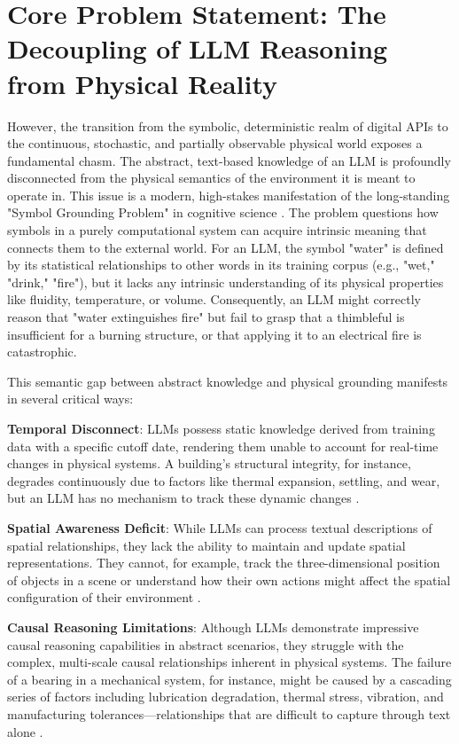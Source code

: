 \section{Core Problem Statement: The Decoupling of LLM Reasoning from Physical Reality}

However, the transition from the symbolic, deterministic realm of digital APIs to the continuous, stochastic, and partially observable physical world exposes a fundamental chasm. The abstract, text-based knowledge of an LLM is profoundly disconnected from the physical semantics of the environment it is meant to operate in. This issue is a modern, high-stakes manifestation of the long-standing "Symbol Grounding Problem" in cognitive science \cite{harnad1990symbol, searle1980minds}. The problem questions how symbols in a purely computational system can acquire intrinsic meaning that connects them to the external world. For an LLM, the symbol "water" is defined by its statistical relationships to other words in its training corpus (e.g., "wet," "drink," "fire"), but it lacks any intrinsic understanding of its physical properties like fluidity, temperature, or volume. Consequently, an LLM might correctly reason that "water extinguishes fire" but fail to grasp that a thimbleful is insufficient for a burning structure, or that applying it to an electrical fire is catastrophic.

This semantic gap between abstract knowledge and physical grounding manifests in several critical ways:

\textbf{Temporal Disconnect}: LLMs possess static knowledge derived from training data with a specific cutoff date, rendering them unable to account for real-time changes in physical systems. A building's structural integrity, for instance, degrades continuously due to factors like thermal expansion, settling, and wear, but an LLM has no mechanism to track these dynamic changes \cite{huang2023dynamic}.

\textbf{Spatial Awareness Deficit}: While LLMs can process textual descriptions of spatial relationships, they lack the ability to maintain and update spatial representations. They cannot, for example, track the three-dimensional position of objects in a scene or understand how their own actions might affect the spatial configuration of their environment \cite{chen2023spatialvlm}.

\textbf{Causal Reasoning Limitations}: Although LLMs demonstrate impressive causal reasoning capabilities in abstract scenarios, they struggle with the complex, multi-scale causal relationships inherent in physical systems. The failure of a bearing in a mechanical system, for instance, might be caused by a cascading series of factors including lubrication degradation, thermal stress, vibration, and manufacturing tolerances—relationships that are difficult to capture through text alone \cite{pearl2018book}.

